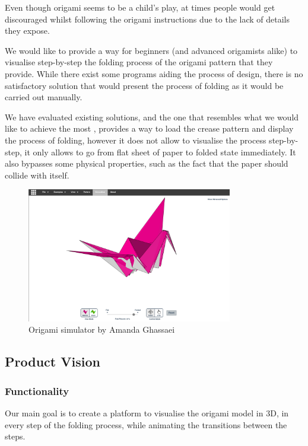 Even though origami seems to be a child's play, at times
people would get discouraged whilst following the origami instructions due to
the lack of details they expose.

We would like to provide a way for beginners (and advanced origamists alike) to visualise step-by-step the folding process of the origami pattern that they provide.
While there exist some programs aiding the process of design, there is no satisfactory solution
that would present the process of folding as it would be carried out manually.

We have evaluated existing solutions, and the one that resembles 
what we would like to achieve the most \cite{origami-simulator}, provides a way to load the crease pattern
and display the process of folding, however it does not allow to visualise the process step-by-step, it only allows 
to go from flat sheet of paper to folded state immediately. It also bypasses some physical properties, such as the fact that the
paper should collide with itself.


\begin{figure}[H]
\caption{Origami simulator by Amanda Ghassaei}
  \centering
    \includegraphics[width=0.8\textwidth]{assets/origami-simulator.png}
\end{figure}

\subsection{Product Vision}

\subsubsection{Functionality}

Our main goal is to create a platform to visualise the origami model in 3D,
in every step of the folding process, while animating the transitions between the steps.

